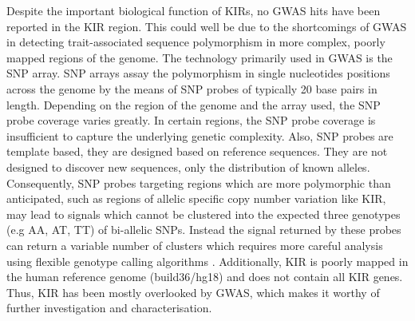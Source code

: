 Despite the important biological function of KIRs, no \gls{GWAS} hits have been reported in the KIR region.
This could well be due to the shortcomings of \gls{GWAS} in detecting trait-associated sequence polymorphism in more complex, poorly mapped regions of the genome.
The technology primarily used in GWAS is the \gls{SNP} array.
SNP arrays assay the polymorphism in single nucleotides positions across the genome by the means of SNP probes of typically 20 base pairs in length.
Depending on the region of the genome and the array used, the SNP probe coverage varies greatly.
In certain regions, the SNP probe coverage is insufficient to capture the underlying genetic complexity.
Also, SNP probes are template based, they are designed based on reference sequences.
They are not designed to discover new sequences, only the distribution of known alleles.
Consequently, SNP probes targeting regions which are more polymorphic than anticipated,
such as regions of allelic specific copy number variation like KIR,
may lead to signals which cannot be clustered into the expected three genotypes (e.g AA, AT, TT) of bi-allelic SNPs.
Instead the signal returned by these probes can return a variable number of clusters which requires 
more careful analysis using flexible genotype calling algorithms \citep{Kumasaka:2011be}.
Additionally, KIR is poorly mapped in the human reference genome (build36/hg18) and does not contain all KIR genes.
Thus, KIR has been mostly overlooked by GWAS, which makes it worthy of further investigation and characterisation.





